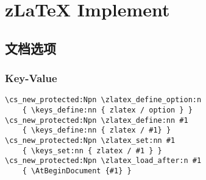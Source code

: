 \chapter{z\LaTeX{} Implement}
\section{文档选项}
\subsection{Key-Value}
\begin{verbatim}
\cs_new_protected:Npn \zlatex_define_option:n
    { \keys_define:nn { zlatex / option } }
\cs_new_protected:Npn \zlatex_define:nn #1
    { \keys_define:nn { zlatex / #1} }
\cs_new_protected:Npn \zlatex_set:nn #1
    { \keys_set:nn { zlatex / #1 } }
\cs_new_protected:Npn \zlatex_load_after:n #1
    { \AtBeginDocument {#1} }
\end{verbatim}


